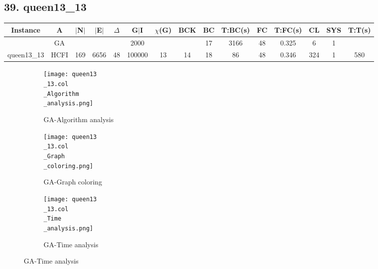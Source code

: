 \documentclass[10pt]{article}
\begin{document}
\subsection*{\hspace{0,9073976cm} 39. queen13\_13 }
\begin{table}[H]
\centering
\begin{tabular}{|c|c|c|c|c|c|c|c|c|c|c|c|c|c|c|}
\hline
Instance& A &$|$N$|$ & $|$E$|$ & $\Delta$ & G$|$I & $\chi$(G) &BCK&BC & T:BC(s) & FC & T:FC(s) & CL & SYS & T:T(s) \\ \hline \hline

	&GA&       &                   &                     &    2000     &     \cellcolor{yellow} & {\cellcolor{yellow}}& {{\cellcolor{green}17}}
&3166   &48        &0.325                   &6                    &1          &        \\ \cline{2-2} \cline{6-6} \cline{9-15}
 \multirow{-2}{*}{queen13\_13} &HCFI   &\multirow{-2}{*}{169}   &\multirow{-2}{*}{6656}     &\multirow{-2}{*}{48}     &100000     &\multirow{-2}{*}{\cellcolor{yellow}13}      & \multirow{-2}{*}{\cellcolor{yellow}14}    &{\cellcolor{green}18}     &86         &48    &0.346         &324    &1     &580       \\ \hline  
\end{tabular}
\end{table}
\graphicspath{{./Core1/Solutions/GA/queen13\_13.col}}
\begin{figure}[H]
\begin{subfigure}{.33\textwidth}
  \centering
  \texttt{[image: queen13\\\_13.col\\\_Algorithm\\\_analysis.png]}
  \caption{GA-Algorithm analysis}
   \label{fig:subfig1}
\end{subfigure}%
\begin{subfigure}{.33\textwidth}
  \centering
  \texttt{[image: queen13\\\_13.col\\\_Graph\\\_coloring.png]}
  \caption{GA-Graph coloring}
  \label{fig:subfig2}
\end{subfigure}
\begin{subfigure}{.33\textwidth}
  \centering
  \texttt{[image: queen13\\\_13.col\\\_Time\\\_analysis.png]}
  \caption{GA-Time analysis}
  \end{subfigure}
\end{figure}
\end{document}

